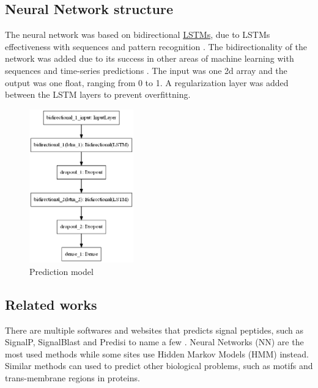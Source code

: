 \subsection{Neural Network structure}
The neural network was based on bidirectional \href{http://colah.github.io/posts/2015-08-Understanding-LSTMs/}{LSTMs}, due to LSTMs effectiveness with sequences and pattern recognition \cite{rnn_effectiveness}. The bidirectionality of the network was added due to its success in other areas of machine learning with sequences and time-series predictions \cite{bidirectional_1} \cite{bidirectional_2}. The input was one 2d array and the output was one float, ranging from 0 to 1. A regularization layer was added between the LSTM layers to prevent overfittning.

\begin{figure}[H]
\centering
\includegraphics[width=0.4\textwidth]{pictures/model.png}
\caption{\label{fig:model_fig}Prediction model}
\end{figure}


\subsection{Related works}

There are multiple softwares and websites that predicts signal peptides, such as SignalP, SignalBlast and Predisi to name a few \cite{sp_predict1} \cite{sp_predict2} \cite{sp_predict3}. Neural Networks (NN) are the most used methods while some sites use Hidden Markov Models (HMM) instead. Similar methods can used to predict other biological problems, such as motifs and trans-membrane regions in proteins.


